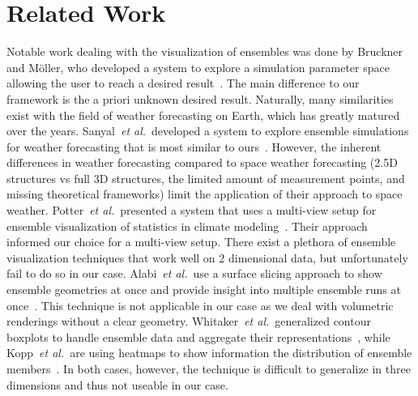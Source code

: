 \documentclass[journal]{vgtc}                %
\def\etal{\textit{et al.}}
\def\etal{\textit{et al.}}
\begin{document}
\section{Related Work}
 Notable work dealing with the visualization of ensembles was done by Bruckner and M\"oller, who developed a system to explore a simulation parameter space allowing the user to reach a desired result~\cite{bruckner2010result}. The main difference to our framework is the a priori unknown desired result. Naturally, many similarities exist with the field of weather forecasting on Earth, which has greatly matured over the years. Sanyal~\etal\ developed a system to explore ensemble simulations for weather forecasting that is most similar to ours~\cite{sanyal2010noodles}. However, the inherent differences in weather forecasting compared to space weather forecasting (2.5D structures vs full 3D structures, the limited amount of measurement points, and missing theoretical frameworks) limit the application of their approach to space weather. Potter~\etal\ presented a system that uses a multi-view setup for ensemble visualization of statistics in climate modeling~\cite{potter2009ensemble}. Their approach informed our choice for a multi-view setup. There exist a plethora of ensemble visualization techniques that work well on 2 dimensional data, but unfortunately fail to do so in our case. Alabi~\etal\ use a surface slicing approach to show ensemble geometries at once and provide insight into multiple ensemble runs at once~\cite{alabi2012comparative}. This technique is not applicable in our case as we deal with volumetric renderings without a clear geometry. Whitaker~\etal\ generalized contour boxplots to handle ensemble data and aggregate their representations~\cite{whitaker2013contour}, while Kopp~\etal\ are using heatmaps to show information the distribution of ensemble members~\cite{kopp2014decision}. In both cases, however, the technique is difficult to generalize in three dimensions and thus not useable in our case.
\end{document}

